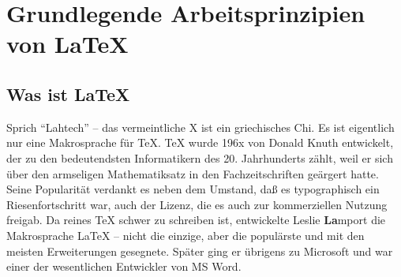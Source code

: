 \documentclass[12pt,table]{scrreprt}
\begin{document}
\chapter{Grundlegende Arbeitsprinzipien von \LaTeX{}}

\section{Was ist \LaTeX}
Sprich \enquote{Lahtech} -- das vermeintliche X ist ein griechisches Chi. Es ist eigentlich nur eine Makrosprache für \TeX{}. \TeX{} wurde 196x von Donald Knuth entwickelt, der zu den bedeutendsten Informatikern des 20. Jahrhunderts zählt, weil er sich über den armseligen Mathematiksatz in den Fachzeitschriften geärgert hatte. Seine Popularität verdankt es neben dem Umstand, daß es typographisch ein Riesenfortschritt war, auch der Lizenz, die es auch zur kommerziellen Nutzung freigab. Da reines \TeX{} schwer zu schreiben ist, entwickelte Leslie \textbf{La}mport die Makrosprache \LaTeX{} -- nicht die einzige, aber die populärste und mit den meisten Erweiterungen gesegnete. Später ging er übrigens zu Microsoft und war einer der wesentlichen Entwickler von MS Word.
 
\end{document}
